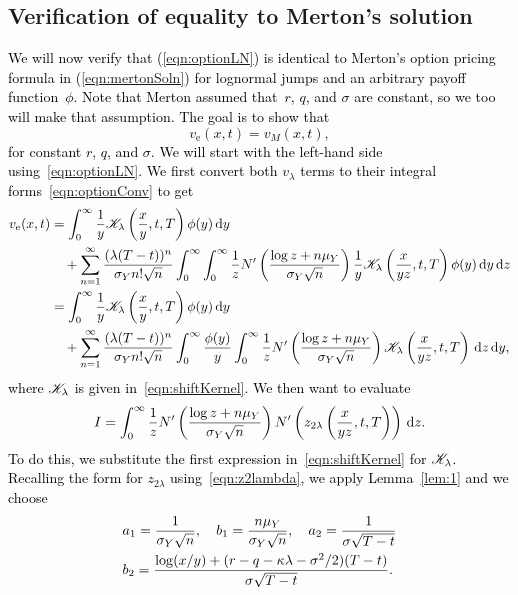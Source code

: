 \subsection{Verification of equality to Merton's solution}
\label{sub:equality}
\textcolor{black}{We will now verify that (\ref{eqn:optionLN}) is identical to Merton's option pricing formula in (\ref{eqn:mertonSoln}) for lognormal jumps and an arbitrary payoff function~$\phi$. Note that Merton assumed that~$r$, $q$, and $\sigma$ are constant, so we too will make that assumption. The goal is to show that
\begin{equation}
	\label{eqn:mertonEquality}
	 v_\text{e}(x,t) = v_M(x,t),
\end{equation}
for constant $r$, $q$, and $\sigma$. We will start with the left-hand side using~\eqref{eqn:optionLN}. We first convert both $v_\lambda$ terms to their integral forms~\eqref{eqn:optionConv} to get
	\begin{align*}
		v_\text{e}(x,t) &= \int_0^\infty \frac{1}{y} \mathscr K_\lambda\left( \frac{x}{y}, t, T \right)\phi(y) \, \mathrm d y \\
		& \quad + \displaystyle\sum\limits_{n=1}^\infty \frac{(\lambda(T-t))^n}{\sigma_Yn!\sqrt{n}}\int_0^\infty \int_0^\infty \frac{1}{z}N'\left( \frac{\log z + n\mu_Y}{\sigma_Y\sqrt{n}} \right)\frac{1}{y}\mathscr K_\lambda\left( \frac{x}{yz}, t, T \right) \phi(y) \, \mathrm d y \, \mathrm d z \\
		&= \int_0^\infty \frac{1}{y} \mathscr K_\lambda\left( \frac{x}{y}, t, T \right)\phi(y) \, \mathrm d y \\
		& \quad + \displaystyle\sum\limits_{n=1}^\infty \frac{(\lambda(T-t))^n}{\sigma_Yn!\sqrt{n}}\int_0^\infty \frac{\phi(y)}{y} \int_0^\infty \frac{1}{z}N'\left( \frac{\log z + n\mu_Y}{\sigma_Y\sqrt{n}} \right)\mathscr K_\lambda\left( \frac{x}{yz}, t, T \right) \, \mathrm d z \, \mathrm d y,
	\end{align*}
where $\mathscr K_\lambda$ is given in~\eqref{eqn:shiftKernel}. We then want to evaluate
$$
		I = \int_0^\infty \frac{1}{z}N'\left( \frac{\log z + n\mu_Y}{\sigma_Y\sqrt{n}} \right)N'\left( z_{2\lambda}\left(\frac{x}{yz}, t, T\right) \right) \, \mathrm d z.
	$$
To do this, we substitute the first expression in~\eqref{eqn:shiftKernel} for $\mathscr K_\lambda$. Recalling the form for $z_{2\lambda}$ using~\eqref{eqn:z2lambda}, we apply Lemma~\ref{lem:1} and we choose
	\begin{align*}
		&a_1 = \frac{1}{\sigma_Y\sqrt{n}}, \quad b_1 = \frac{n\mu_Y}{\sigma_Y\sqrt{n}}, \quad a_2 = \frac{1}{\sigma\sqrt{T-t}} \\
		&b_2 = \frac{\log(x/y) + (r - q - \kappa\lambda -\sigma^2/2)(T-t)}{\sigma\sqrt{T-t}}.
	\end{align*}
}
